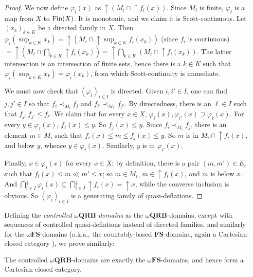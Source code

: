 \documentclass{LMCS}
\newcommand\upc{\mathop{\uparrow}\nolimits}
\newcommand\QRB{\mathbf{QRB}}
\newcommand\FS{\mathbf{FS}}
\begin{document}
\begin{proof}
  We now define $\varphi_i (x)$ as $\upc (M_i \cap \upc f_i (x))$.
  Since $M_i$ is finite, $\varphi_i$ is a map from $X$ to $\mathop{\text{Fin}} (X)$.
  It is monotonic, and we claim it is Scott-continuous.  Let
  ${(x_k)}_{k \in K}$ be a directed family in $X$.  Then ${\varphi_i
    (\sup_{k \in K} x_k)} = \upc (M_i \cap \upc \sup_{k \in K} f_i
  (x_k))$ (since $f_i$ is continuous) $= \upc (M_i \cap \bigcap_{k \in
    K} \upc f_i (x_k)) = \upc \bigcap_{k \in K} (M_i \cap \upc f_i
  (x_k))$.  The latter intersection is an intersection of finite sets,
  hence there is a $k \in K$ such that ${\varphi_i (\sup_{k \in K}
    x_k)} = \varphi_i (x_k)$, from which Scott-continuity is
  immediate.

  We must now check that ${(\varphi_i)}_{i \in I}$ is directed.  Given
  $i, i' \in I$, one can find $j, j' \in I$ so that $f_i \prec_{M_i}
  f_j$ and $f_{i'} \prec_{M_{i'}} f_{j'}$.  By directedness, there is
  an $\ell \in I$ such that $f_j, f_{j'} \leq f_\ell$.  We claim that
  for every $x \in X$, $\varphi_i (x), \varphi_{i'} (x) \supseteq
  \varphi_\ell (x)$.  For every $y \in \varphi_\ell (x)$, $f_\ell (x)
  \leq y$.  So $f_j (x) \leq y$.  Since $f_i \prec_{M_i} f_j$, there
  is an element $m \in M_i$ such that $f_i (x) \leq m \leq f_j (x)
  \leq y$.  So $m$ is in $M_i \cap \upc f_i (x)$, and below $y$,
  whence $y \in \varphi_i (x)$.  Similarly, $y$ is in $\varphi_{i'}
  (x)$.

  Finally, $x \in {\varphi_i (x)}$ for every $x \in X$: by definition,
  there is a pair $(m, m') \in E_i$ such that $f_i (x) \leq m \ll m'
  \leq x$; so $m \in M_i$, $m \in \upc f_i (x)$, and $m$ is below $x$.
  And $\bigcap_{i \in I}^\downarrow {\varphi_i (x)} \subseteq
  \bigcap_{i \in I}^\downarrow \upc f_i (x) = \upc x$, while the
  converse inclusion is obvious.  So ${(\varphi_i)}_{i \in I}$ is a
  generating family of quasi-deflations.
\end{proof}

Defining the {\em controlled $\omega\QRB$-domains\/} as the
$\omega\QRB$-domains, except with sequences of controlled
quasi-deflations instead of directed families, and similarly for the
$\omega\FS$-domains (a.k.a., the countably-based $\FS$-domains, again
a Cartesian-closed category \cite[Theorem~11]{Jung:CCC:LICS}), we
prove similarly:
\begin{thm}
  \label{thm:omega:ctrlQRB}
  The controlled $\omega\QRB$-domains are exactly the
  $\omega\FS$-domains, and hence form a Cartesian-closed category.
\end{thm}
\end{document}
